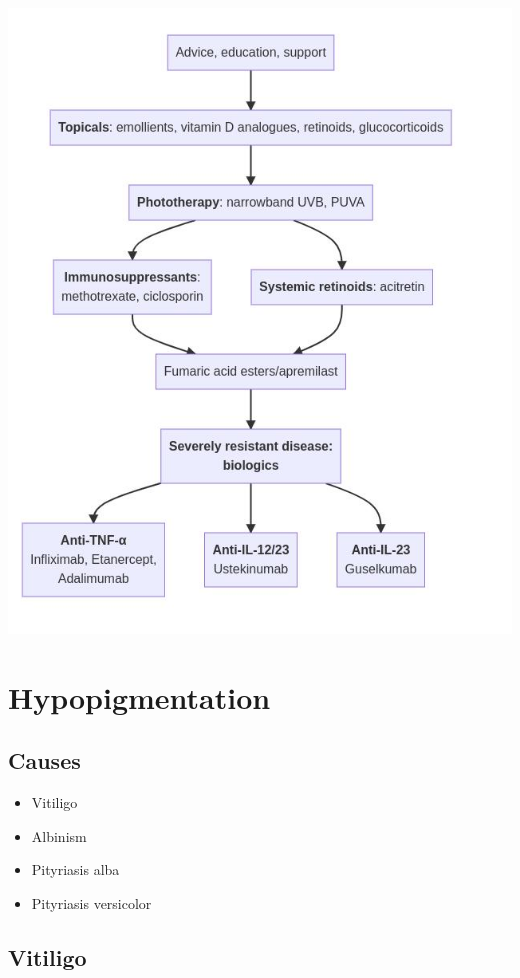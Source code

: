 \documentclass[
  12pt,
]{memoir}
\providecommand{\tightlist}{%
  \setlength{\itemsep}{0pt}\setlength{\parskip}{0pt}}
\begin{document}
\includegraphics[width=.85\textwidth]{../assets/psoriasis.jpg}

\pagebreak

\hypertarget{hypopigmentation}{%
\section{Hypopigmentation}\label{hypopigmentation}}

\hypertarget{causes-1}{%
\subsection{Causes}\label{causes-1}}

\begin{itemize}
\tightlist
\item
  Vitiligo
\item
  Albinism
\item
  Pityriasis alba
\item
  Pityriasis versicolor
\end{itemize}

\hypertarget{vitiligo}{%
\subsection{Vitiligo}\label{vitiligo}}
\end{document}
